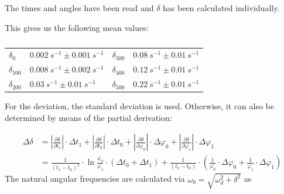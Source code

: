             The times and angles have been read and \(\delta\) has been calculated individually.\par
            This gives us the following mean values:\par
            \begin{table}[h]
                \centering
                \caption[Mean values of the dampening coefficient]{}
                \begin{tabular}{@{}llll@{}}
                    \toprule
                    $\delta_0$        &$\SI{0.002}{s^{-1}} \pm \SI{0.001}{s^{-1}}$  &\hspace{10mm}$\delta_{300}$ &$\SI{0.08}{s^{-1}} \pm \SI{0.01}{s^{-1}}$\\
                    $\delta_{100}$    &$\SI{0.008}{s^{-1}} \pm \SI{0.002}{s^{-1}}$  &\hspace{10mm}$\delta_{400}$ &$\SI{0.12}{s^{-1}} \pm \SI{0.01}{s^{-1}}$\\
                    $\delta_{200}$    &$\SI{0.03}{s^{-1}} \pm \SI{0.01}{s^{-1}}$    &\hspace{10mm}$\delta_{500}$ &$\SI{0.22}{s^{-1}} \pm \SI{0.01}{s^{-1}}$\\
                    \bottomrule
                \end{tabular}
                \label{tab:dampening_coefficients}
            \end{table}
            For the deviation, the standard deviation is used. Otherwise, it can also be determined by means of the partial derivation:\par
            \begin{align}
                \Delta\delta    &= \left| \frac{\partial\delta}{\partial t_1} \right| \cdot \Delta t_1 + \left| \frac{\partial\delta}{\partial t_0} \right| \cdot \Delta t_0 + \left| \frac{\partial\delta}{\partial \varphi_0} \right| \cdot \Delta \varphi_0 + \left| \frac{\partial\delta}{\partial \varphi_1} \right| \cdot \Delta \varphi_1 \nonumber\\
                                &= \frac{1}{(t_1-t_0)^2} \cdot \ln{\frac{\varphi_0}{\varphi_1}} \cdot (\Delta t_0 + \Delta t_1) + \frac{1}{(t_1-t_0)} \cdot \left( \frac{1}{\varphi_0} \cdot \Delta\varphi_0 + \frac{1}{\varphi_1} \cdot \Delta\varphi_1 \right)
            \end{align}%
            The natural angular frequencies are calculated via $ \omega_0=\sqrt{\omega_d^2+\delta^2} $ as\par
